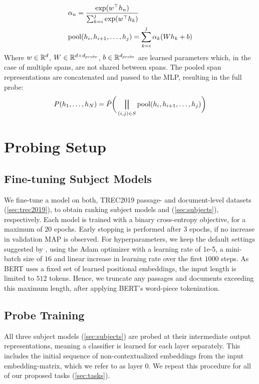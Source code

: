 \begin{equation}
    \begin{aligned}
         & \alpha_n = \frac{\exp(w^\top h_n)}{\sum_{k=i}^j{\exp(w^\top h_k)}}   \\
         & \text{pool}(h_i, h_{i+1},\dots, h_j)= \sum_{k=i}^j\alpha_k (W h_k + b)
    \end{aligned}
\end{equation}
Where $w \in \mathbb{R}^{d}$, $W \in \mathbb{R}^{d \times d_{probe}}$, $b \in \mathbb{R}^{d_{probe}}$ are learned parameters which, in the case of multiple spans, are not shared between spans. The pooled span representations are concatenated and passed to the MLP, resulting in the full probe:
\begin{equation}
    P(h_1,\dots, h_N) = \hat{P}\bigg(\bigparallel_{(i, j) \in S}{\text{pool}(h_i, h_{i+1},\dots, h_j)}\bigg)
\end{equation}

\section{Probing Setup}
\subsection{Fine-tuning Subject Models}
We fine-tune a  model on both, TREC2019 passage- and document-level datasets (\autoref{sec:trec2019}), to obtain ranking subject models  and  (\autoref{sec:subjects}), respectively. Each model is trained with a binary cross-entropy objective, for a maximum of $20$ epochs. Early stopping is performed after $3$ epochs, if no increase in validation MAP is observed. For hyperparameters, we keep the default settings suggested by \cite{devlin-etal-2019-bert}, using the Adam optimizer\cite{kingma2014adam} with a learning rate of 1e-5, a mini-batch size of $16$ and linear increase in learning rate over the first $1000$ steps. As BERT uses a fixed set of learned positional embeddings, the input length is limited to $512$ tokens. Hence, we truncate any passages and documents exceeding this maximum length, after applying BERT's word-piece tokenization.

\subsection{Probe Training}
All three subject models (\autoref{sec:subjects}) are probed at their intermediate output representations, meaning a classifier is learned for each layer separately. This includes the initial sequence of non-contextualized embeddings from the input embedding-matrix, which we refer to as layer $0$. We repeat this procedure for all of our proposed tasks (\autoref{sec:tasks}).


